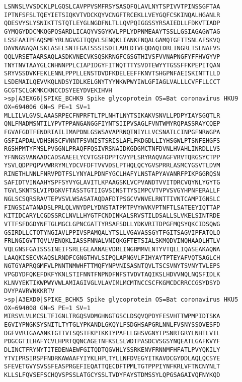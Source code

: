\begin{lstlisting}
LSNNSLVVSDCKLPLGQSLCAVPPVSMFRSYSASQFQLAVLNYTSPIVVTPINSSGFTAA
IPTNFSFSLTQEYIETSIQKVTVDCKQYVCNGFTRCEKLLVEYGQFCSKINQALHGANLR
QDESVYSLYSNIKTTSTQTLEYGLNGDFNLTLLQVPQIGGSSYRSAIEDLLFDKVTIADP
GYMQGYDDCMKQGPQSARDLICAQYVSGYKVLPPLYDPNMEAAYTSSLLGSIAGAGWTAG
LSSFAAIPFAQSMFYRLNGVGITQQVLSENQKLIANKFNQALGAMQTGFTTSNLAFSKVQ
DAVNANAQALSKLASELSNTFGAISSSISDILARLDTVEQDAQIDRLINGRLTSLNAFVS
QQLVRSETAARSAQLASDKVNECVKSQSKRNGFCGSGTHIVSFVVNAPNGFYFFHVGYVP
TNYTNVTAAYGLCNHNNPPLCIAPIDGYFITNQTTTYSVDTEWYYTGSSFFKPEPITQAN
SRYVSSDVKFEKLENNLPPPLLENSTDVDFKDELEEFFKNVTSHGPNFAEISKINTTLLD
LSDEMAILQEVVKQLNDSYIDLKELGNYTYYNKWPWYIWLGFIAGLVALLLCVFFLLCCT
GCGTSCLGKMKCKNCCDSYEEYDVEKIHVH
>sp|A3EXG6|SPIKE_BCHK9 Spike glycoprotein OS=Bat coronavirus HKU9 OX=694006 GN=S PE=1 SV=1
MLLILVLGVSLAAASRPECFNPRFTLTPLNHTLNYTSIKAKVSNVLLPDPYIAYSGQTLR
QNLFMADMSNTILYPVTPPANGANGGFIYNTSIIPVSAGLFVNTWMYRQPASSRAYCQEP
FGVAFGDTFENDRIAILIMAPDNLGSWSAVAPRNQTNIYLLVCSNATLCINPGFNRWGPA
GSFIAPDALVDHSNSCFVNNTFSVNISTSRISLAFLFKDGDLLIYHSGWLPTSNFEHGFS
RGSHPMTYFMSLPVGGNLPRAQFFQSIVRSNAIDKGDGMCTNFDVNLHVAHLINRDLLVS
YFNNGSVANAADCADSAAEELYCVTGSFDPPTGVYPLSRYRAQVAGFVRVTQRGSYCTPP
YSVLQDPPQPVVWRRYMLYDCVFDFTVVVDSLPTHQLQCYGVSPRRLASMCYGSVTLDVM
RINETHLNNLFNRVPDTFSLYNYALPDNFYGCLHAFYLNSTAPYAVANRFPIKPGGRQSN
SAFIDTVINAAHYSPFSYVYGLAVITLKPAAGSKLVCPVANDTVVITDRCVQYNLYGYTG
TGVLSKNTSLVIPDGKVFTASSTGTIIGVSINSTTYSIMPCVTVPVSVGYHPNFERALLF
NGLSCSQRSRAVTEPVSVLWSASATAQDAFDTPSGCVVNVELRNTTIVNTCAMPIGNSLC
FINGSIATANADSLPRLQLVNYDPLYDNSTATPMTPVYWVKVPTNFTLSATEEYIQTTAP
KITIDCARYLCGDSSRCLNVLLHYGTFCNDINKALSRVSTILDSALLSLVKELSINTRDE
VTTFSFDGDYNFTGLMGCLGPNCGATTYRSAFSDLLYDKVRITDPGFMQSYQKCIDSQWG
GSIRDLLCTQTYNGIAVLPPIVSPAMQALYTSLLVGAVASSGYTFGITSAGVIPFATQLQ
FRLNGIGVTTQVLVENQKLIASSFNNALVNIQKGFTETSIALSKMQDVINQHAAQLHTLV
VQLGNSFGAISSSINEIFSRLEGLAANAEVDRLINGRMMVLNTYVTQLLIQASEAKAQNA
LAAQKISECVKAQSLRNDFCGNGTHVLSIPQLAPNGVLFIHYAYTPTEYAFVQTSAGLCH
NGTGYAPRQGMFVLPNNTNMWHFTTMQFYNPVNISASNTQVLTSCSVNYTSVNYTVLEPS
VPGDYDFQKEFDKFYKNLSTIFNNTFNPNDFNFSTVDVTAQIKSLHDVVNQLNQSFIDLK
KLNVYEKTIKWPWYVWLAMIAGIVGLVLAVIMLMCMTNCCSCFKGMCDCRRCCGSYDSYD
DVYPAVRVNKKRTV
>sp|A3EXD0|SPIKE_BCHK5 Spike glycoprotein OS=Bat coronavirus HKU5 OX=694008 GN=S PE=1 SV=1
MIRSVLVLMCSLTFIGNLTRGQSVDMGHNGTGSCLDSQVQPDYFESVHTTWPMPIDTSKA
EGVIYPNGKSYSNITLTYTGLYPKANDLGKQYLFSDGHSAPGRLNNLFVSNYSSQVESFD
DGFVVRIGAAANKTGTTVISQSTFKPIKKIYPAFLLGHSVGNYTPSNRTGRYLNHTLVIL
PDGCGTILHAFYCVLHPRTQQNCAGETNFKSLSLWDTPASDCVSGSYNQEATLGAFKVYF
DLINCTFRYNYTITEDENAEWFGITQDTQGVHLYSSRKENVFRNNMFHFATLPVYQKILY
YTVIPRSIRSPFNDRKAWAAFYIYKLHPLTYLLNFDVEGYITKAVDCGYDDLAQLQCSYE
SFEVETGVYSVSSFEASPRGEFIEQATTQECDFTPMLTGTPPPIYNFKRLVFTNCNYNLT
KLLSLFQVSEFSCHQVSPSSLATGCYSSLTVDYFAYSTDMSSYLQPGSAGAIVQFNYKQD

\end{lstlisting}
